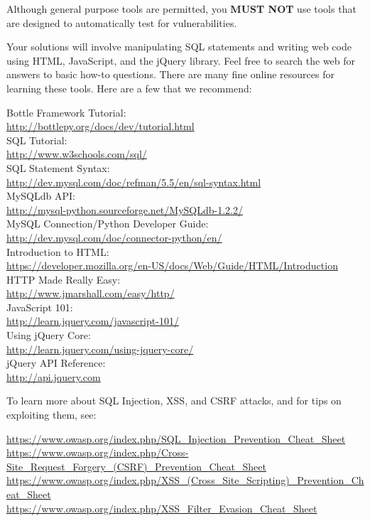\documentclass[letterpaper,12pt]{report}
\begin{document}
\smallskip

Although general purpose tools are permitted, you \textbf{MUST NOT} use tools that are designed to automatically test for vulnerabilities.

\medskip

Your solutions will involve manipulating SQL statements and writing web code using HTML, JavaScript, and the jQuery library.  Feel free to search the web for answers to basic how-to questions.  There are many fine online resources for learning these tools.  Here are a few that we recommend:
\medskip

Bottle Framework Tutorial:\\
\url{http://bottlepy.org/docs/dev/tutorial.html} \\
SQL Tutorial:\\
\url{http://www.w3schools.com/sql/} \\
SQL Statement Syntax:\\
\url{http://dev.mysql.com/doc/refman/5.5/en/sql-syntax.html} \\
MySQLdb API:\\
\url{http://mysql-python.sourceforge.net/MySQLdb-1.2.2/} \\
MySQL Connection/Python Developer Guide:\\
\url{http://dev.mysql.com/doc/connector-python/en/} \\
Introduction to HTML:\\ \url{https://developer.mozilla.org/en-US/docs/Web/Guide/HTML/Introduction} \\
HTTP Made Really Easy:\\
\url{http://www.jmarshall.com/easy/http/} \\
JavaScript 101:\\
\url{http://learn.jquery.com/javascript-101/} \\
Using jQuery Core:\\ 
\url{http://learn.jquery.com/using-jquery-core/} \\
jQuery API Reference:\\
\url{http://api.jquery.com} \\

\bigskip

To learn more about SQL Injection, XSS, and CSRF attacks, and for tips on exploiting them, see:
\medskip

\url{https://www.owasp.org/index.php/SQL_Injection_Prevention_Cheat_Sheet}\\
\url{https://www.owasp.org/index.php/Cross-Site_Request_Forgery_(CSRF)_Prevention_Cheat_Sheet}\\
\url{https://www.owasp.org/index.php/XSS_(Cross_Site_Scripting)_Prevention_Cheat_Sheet}\\
\url{https://www.owasp.org/index.php/XSS_Filter_Evasion_Cheat_Sheet}\\
\end{document}
